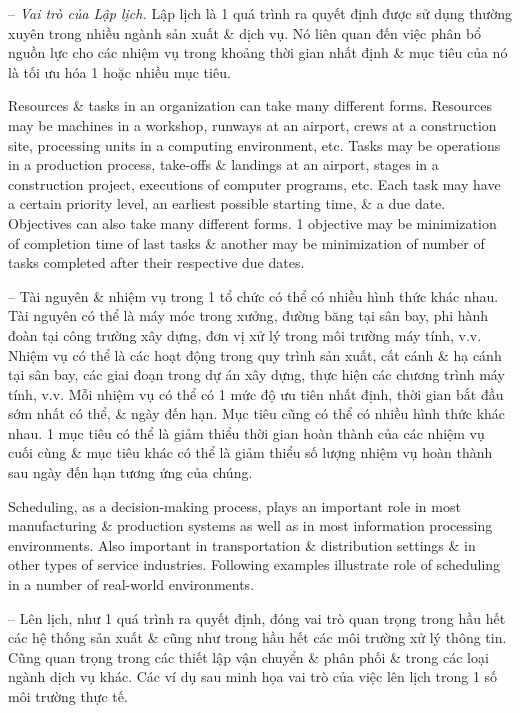 \documentclass{article}
\begin{document}
\begin{itemize}
\begin{itemize}
        -- {\it Vai trò của Lập lịch.} Lập lịch là 1 quá trình ra quyết định được sử dụng thường xuyên trong nhiều ngành sản xuất \& dịch vụ. Nó liên quan đến việc phân bổ nguồn lực cho các nhiệm vụ trong khoảng thời gian nhất định \& mục tiêu của nó là tối ưu hóa 1 hoặc nhiều mục tiêu.

        Resources \& tasks in an organization can take many different forms. Resources may be machines in a workshop, runways at an airport, crews at a construction site, processing units in a computing environment, etc. Tasks may be operations in a production process, take-offs \& landings at an airport, stages in a construction project, executions of computer programs, etc. Each task may have a certain priority level, an earliest possible starting time, \& a due date. Objectives can also take many different forms. 1 objective may be minimization of completion time of last tasks \& another may be minimization of number of tasks completed after their respective due dates.

        -- Tài nguyên \& nhiệm vụ trong 1 tổ chức có thể có nhiều hình thức khác nhau. Tài nguyên có thể là máy móc trong xưởng, đường băng tại sân bay, phi hành đoàn tại công trường xây dựng, đơn vị xử lý trong môi trường máy tính, v.v. Nhiệm vụ có thể là các hoạt động trong quy trình sản xuất, cất cánh \& hạ cánh tại sân bay, các giai đoạn trong dự án xây dựng, thực hiện các chương trình máy tính, v.v. Mỗi nhiệm vụ có thể có 1 mức độ ưu tiên nhất định, thời gian bắt đầu sớm nhất có thể, \& ngày đến hạn. Mục tiêu cũng có thể có nhiều hình thức khác nhau. 1 mục tiêu có thể là giảm thiểu thời gian hoàn thành của các nhiệm vụ cuối cùng \& mục tiêu khác có thể là giảm thiểu số lượng nhiệm vụ hoàn thành sau ngày đến hạn tương ứng của chúng.

        Scheduling, as a decision-making process, plays an important role in most manufacturing \& production systems as well as in most information processing environments. Also important in transportation \& distribution settings \& in other types of service industries. Following examples illustrate role of scheduling in a number of real-world environments.

        -- Lên lịch, như 1 quá trình ra quyết định, đóng vai trò quan trọng trong hầu hết các hệ thống sản xuất \& cũng như trong hầu hết các môi trường xử lý thông tin. Cũng quan trọng trong các thiết lập vận chuyển \& phân phối \& trong các loại ngành dịch vụ khác. Các ví dụ sau minh họa vai trò của việc lên lịch trong 1 số môi trường thực tế.


\end{itemize}
\end{itemize}
\end{document}
